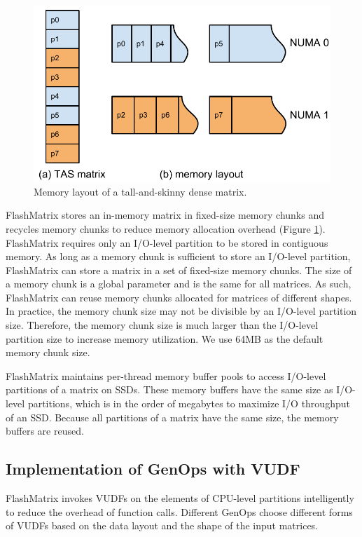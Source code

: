 \begin{figure}
	\centering
	\includegraphics[scale=0.5]{./matrix_mem.pdf}
	\caption{Memory layout of a tall-and-skinny dense matrix.}
	\label{fig:mat_mem}
\end{figure}

FlashMatrix stores an in-memory matrix in fixed-size memory chunks and
recycles memory chunks to reduce memory allocation overhead (Figure
\ref{fig:mat_mem}). FlashMatrix requires only an I/O-level partition to
be stored in contiguous memory. As long as a memory chunk is sufficient
to store an I/O-level partition, FlashMatrix can store a matrix in a set
of fixed-size memory chunks. The size of a memory chunk is a global parameter
and is the same for all matrices. As such, FlashMatrix can reuse memory chunks
allocated for matrices of different shapes. In practice, the memory chunk size
may not be divisible by an I/O-level partition size. Therefore, the memory chunk
size is much larger than the I/O-level partition size to increase
memory utilization. We use 64MB as the default memory chunk size.

FlashMatrix maintains per-thread memory buffer pools to access I/O-level
partitions of a matrix on SSDs. These memory buffers have the same size as
I/O-level partitions, which is in the order of megabytes to maximize I/O
throughput of an SSD. Because all partitions of a matrix have the same size,
the memory buffers are reused.

\subsection{Implementation of GenOps with VUDF}

FlashMatrix invokes VUDFs on the elements of CPU-level partitions intelligently
to reduce the overhead of function calls. Different GenOps choose different
forms of VUDFs based on the data layout and the shape of the input matrices.

